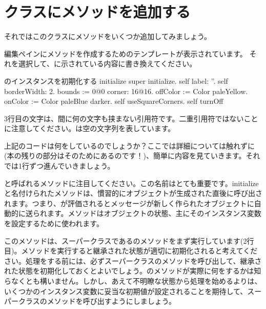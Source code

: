\documentclass[a4paper,10pt,twoside]{book}
\begin{document}
\section{クラスにメソッドを追加する}

それではこのクラスにメソッドをいくつか追加してみましょう。


編集ペインにメソッドを作成するためのテンプレートが表示されています。
それを選択して、に示されている内容に書き換えてください。


\begin{numMethod}[scbecellinitialize]{のインスタンスを初期化する}
initialize
   super initialize.
   self label: ''.
   self borderWidth: 2.
   bounds := 0@0 corner: 16@16.
   offColor := Color paleYellow.
   onColor := Color paleBlue darker.
   self useSquareCorners.
   self turnOff
\end{numMethod}

\noindent
3行目の文字は、間に何の文字も挟まない引用符です。二重引用符ではないことに注意してください。は空の文字列を表しています。


上記のコードは何をしているのでしょうか？ここでは詳細については触れずに(本の残りの部分はそのためにあるのです！)、簡単に内容を見ていきます。それでは1行ずつ進んでいきましょう。

と呼ばれるメソッドに注目してください。この名前はとても重要です。initializeと名付けられたメソッドは、慣習的にオブジェクトが生成された直後に呼び出されます。つまり、が評価されるとメッセージが新しく作られたオブジェクトに自動的に送られます。メソッドはオブジェクトの状態、主にそのインスタンス変数を設定するために使われます。

このメソッドは、スーパークラスであるのメソッドをまず実行しています(2行目)。メソッドを実行すると継承された状態が適切に初期化されると考えてください。処理をする前には、必ずスーパークラスのメソッドを呼び出して、継承された状態を初期化しておくとよいでしょう。のメソッドが実際に何をするかは知らなくとも構いません。しかし、あえて不明瞭な状態から処理を始めるよりは、いくつかのインスタンス変数に妥当な初期値が設定されることを期待して、スーパークラスのメソッドを呼び出すようにしましょう。
\end{document}
